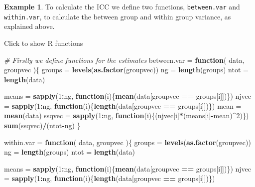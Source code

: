 \documentclass[
  openany]{book}
\newenvironment{Shaded}{\begin{snugshade}}{\end{snugshade}}
\newcommand{\CommentTok}[1]{\textcolor[rgb]{0.56,0.35,0.01}{\textit{#1}}}
\newcommand{\ControlFlowTok}[1]{\textcolor[rgb]{0.13,0.29,0.53}{\textbf{#1}}}
\newcommand{\DecValTok}[1]{\textcolor[rgb]{0.00,0.00,0.81}{#1}}
\newcommand{\FunctionTok}[1]{\textcolor[rgb]{0.13,0.29,0.53}{\textbf{#1}}}
\newcommand{\NormalTok}[1]{#1}
\newcommand{\OtherTok}[1]{\textcolor[rgb]{0.56,0.35,0.01}{#1}}
\newcommand{\SpecialCharTok}[1]{\textcolor[rgb]{0.81,0.36,0.00}{\textbf{#1}}}
\theoremstyle{definition}
\theoremstyle{definition}
\newtheorem{example}{Example}[chapter]
\theoremstyle{definition}
\theoremstyle{definition}
\theoremstyle{remark}
\begin{document}
\begin{example}
To calculate the ICC we define two functions, \texttt{between.var} and \texttt{within.var}, to calculate the between group and within group variance, as explained above.

Click to show R functions

\begin{Shaded}
\begin{Highlighting}[]
\CommentTok{\# Firstly we define functions for the estimates}
\NormalTok{between.var }\OtherTok{=} \ControlFlowTok{function}\NormalTok{(}
\NormalTok{    data,}
\NormalTok{    groupvec}
\NormalTok{)\{}
\NormalTok{  groups }\OtherTok{=} \FunctionTok{levels}\NormalTok{(}\FunctionTok{as.factor}\NormalTok{(groupvec))}
\NormalTok{  ng }\OtherTok{=} \FunctionTok{length}\NormalTok{(groups)}
\NormalTok{  ntot }\OtherTok{=} \FunctionTok{length}\NormalTok{(data)}
  
  
\NormalTok{  means }\OtherTok{=} \FunctionTok{sapply}\NormalTok{(}\DecValTok{1}\SpecialCharTok{:}\NormalTok{ng, }\ControlFlowTok{function}\NormalTok{(i)\{}\FunctionTok{mean}\NormalTok{(data[groupvec }\SpecialCharTok{==}\NormalTok{ groups[i]])\})}
\NormalTok{  njvec }\OtherTok{=} \FunctionTok{sapply}\NormalTok{(}\DecValTok{1}\SpecialCharTok{:}\NormalTok{ng, }\ControlFlowTok{function}\NormalTok{(i)\{}\FunctionTok{length}\NormalTok{(data[groupvec }\SpecialCharTok{==}\NormalTok{ groups[i]])\})}
\NormalTok{  mean }\OtherTok{=} \FunctionTok{mean}\NormalTok{(data)}
\NormalTok{  ssqvec }\OtherTok{=} \FunctionTok{sapply}\NormalTok{(}\DecValTok{1}\SpecialCharTok{:}\NormalTok{ng, }\ControlFlowTok{function}\NormalTok{(i)\{(njvec[i]}\SpecialCharTok{*}\NormalTok{(means[i]}\SpecialCharTok{{-}}\NormalTok{mean)}\SpecialCharTok{\^{}}\DecValTok{2}\NormalTok{)\})}
  \FunctionTok{sum}\NormalTok{(ssqvec)}\SpecialCharTok{/}\NormalTok{(ntot}\SpecialCharTok{{-}}\NormalTok{ng)}
\NormalTok{\}}

\NormalTok{within.var }\OtherTok{=} \ControlFlowTok{function}\NormalTok{(}
\NormalTok{    data,}
\NormalTok{    groupvec}
\NormalTok{)\{}
\NormalTok{  groups }\OtherTok{=} \FunctionTok{levels}\NormalTok{(}\FunctionTok{as.factor}\NormalTok{(groupvec))}
\NormalTok{  ng }\OtherTok{=} \FunctionTok{length}\NormalTok{(groups)}
\NormalTok{  ntot }\OtherTok{=} \FunctionTok{length}\NormalTok{(data)}
  
\NormalTok{  means }\OtherTok{=} \FunctionTok{sapply}\NormalTok{(}\DecValTok{1}\SpecialCharTok{:}\NormalTok{ng, }\ControlFlowTok{function}\NormalTok{(i)\{}\FunctionTok{mean}\NormalTok{(data[groupvec }\SpecialCharTok{==}\NormalTok{ groups[i]])\})}
\NormalTok{  njvec }\OtherTok{=} \FunctionTok{sapply}\NormalTok{(}\DecValTok{1}\SpecialCharTok{:}\NormalTok{ng, }\ControlFlowTok{function}\NormalTok{(i)\{}\FunctionTok{length}\NormalTok{(data[groupvec }\SpecialCharTok{==}\NormalTok{ groups[i]])\})}



\end{Highlighting}
\end{Shaded}
\end{example}
\end{document}
